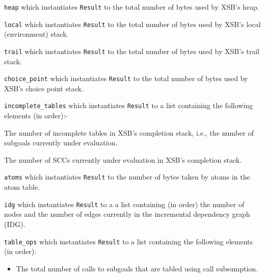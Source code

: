 \begin{description}
%
%
\item {\tt heap} which instantiates {\tt Result} to the total number
  of bytes used by XSB's heap.
%
\item {\tt local} which instantiates {\tt Result} to the total number
  of bytes used by XSB's local (environment) stack.
%
\item {\tt trail} which instantiates {\tt Result} to the total number
  of bytes used by XSB's trail stack.
%
\item {\tt choice\_point} which instantiates {\tt Result} to the total
  number of bytes used by XSB's choice point stack.
%
\item {\tt incomplete\_tables} which instantiates {\tt Result} to a
 list containing the following elements (in order):-
\bi
\item The number of incomplete tables in XSB's completion stack, i.e.,
 the number of subgoals currently under evaluation.
%
\item The number of SCCs currently under evaluation in XSB's
 completion stack.  
\ei 
%
\item {\tt atoms} which instantiates {\tt Result} to the number of
 bytes taken by atoms in the atom table.
%
\item {\tt idg} which instantiates {\tt Result} to a a list containing
 (in order) the number of nodes and the number of edges currently in
 the incremental dependency graph (IDG).
%
\item {\tt table\_ops} which instantiates {\tt Result} to a list
 containing the following elements (in order):
\begin{itemize}
\item The total number of calls to subgoals that are tabled using call
 subsumption.


\end{itemize}
\end{description}
